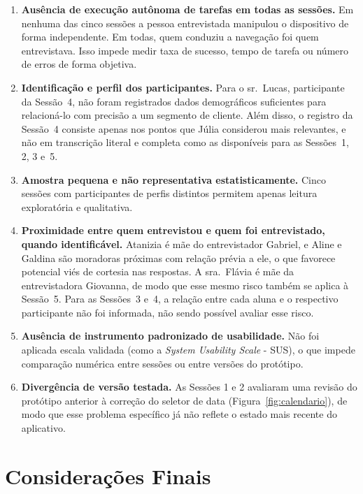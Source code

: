 \documentclass[
    12pt,
    openright,
    oneside,
    a4paper
]{abntex2}
\begin{document}
\begin{enumerate}[leftmargin=*]
  \item \textbf{Ausência de execução autônoma de tarefas em todas as sessões.} Em nenhuma das
        cinco sessões a pessoa entrevistada manipulou o dispositivo de forma independente. Em todas, quem conduziu a navegação foi quem entrevistava. Isso impede medir taxa de
        sucesso, tempo de tarefa ou número de erros de forma objetiva.
  \item \textbf{Identificação e perfil dos participantes.} Para o sr.~Lucas, participante da Sessão~4, não
        foram registrados dados demográficos suficientes para relacioná-lo com precisão a um
        segmento de cliente. Além disso, o registro da Sessão~4 consiste apenas nos pontos
        que Júlia considerou mais relevantes, e não em transcrição literal e completa como
        as disponíveis para as Sessões~1, 2, 3 e~5.
  \item \textbf{Amostra pequena e não representativa estatisticamente.} Cinco sessões com
        participantes de perfis distintos permitem apenas leitura exploratória e
        qualitativa.
  \item \textbf{Proximidade entre quem entrevistou e quem foi entrevistado, quando
        identificável.} Atanizia é mãe do entrevistador Gabriel, e Aline e Galdina são
        moradoras próximas com relação prévia a ele, o que favorece potencial viés de
        cortesia nas respostas. A sra.~Flávia é mãe da entrevistadora Giovanna, de modo que
        esse mesmo risco também se aplica à Sessão~5. Para as Sessões~3 e~4, a relação entre
        cada aluna e o respectivo participante não foi informada, não sendo possível avaliar
        esse risco.
  \item \textbf{Ausência de instrumento padronizado de usabilidade.} Não foi aplicada escala
        validada (como a \textit{System Usability Scale} - SUS), o que impede comparação
        numérica entre sessões ou entre versões do protótipo.
  \item \textbf{Divergência de versão testada.} As Sessões 1 e 2 avaliaram uma revisão do
        protótipo anterior à correção do seletor de data (Figura~\ref{fig:calendario}), de
        modo que esse problema específico já não reflete o estado mais recente do
        aplicativo.

\end{enumerate}

\chapter{Considerações Finais}
\end{document}
